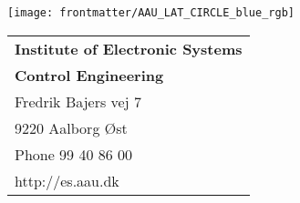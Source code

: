\thispagestyle{empty}
\noindent
\begin{minipage}[l]{0.50\textwidth}
	\centering
	\texttt{[image: frontmatter/AAU\_LAT\_CIRCLE\_blue\_rgb]}
\end{minipage}
\begin{minipage}[r]{0.50\textwidth}

\noindent
	\begin{tabular}{l}
		{\textsf{\small \textbf{Institute of Electronic Systems}}}\\
		{\textsf{\small \textbf{Control Engineering}}} \\
		{\textsf{\small Fredrik Bajers vej 7}} \\
		{\textsf{\small 9220 Aalborg \O st}} \\
		{\textsf{\small Phone 99 40 86 00}} \\
		{\textsf{\small http://es.aau.dk}}
	\end{tabular}
\end{minipage}


